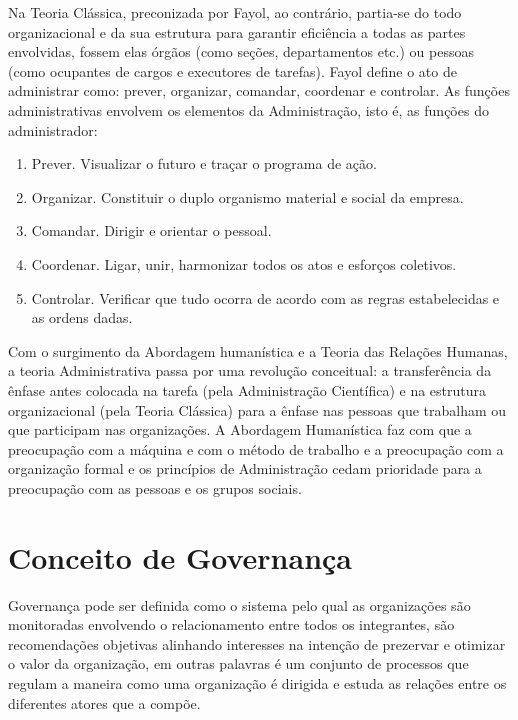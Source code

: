 Na Teoria Clássica, preconizada por Fayol, ao contrário, partia-se do todo 
organizacional e da sua estrutura para garantir eficiência a todas as partes 
envolvidas, fossem elas órgãos (como seções, departamentos etc.) ou pessoas 
(como ocupantes de cargos e executores de tarefas).
%
Fayol define o ato de administrar como: prever, organizar, comandar, coordenar 
e controlar. As funções administrativas envolvem os elementos da Administração, 
isto é, as funções do administrador:\cite{chiavenato2001teoria}

\begin{enumerate}

\item Prever. Visualizar o futuro e traçar o programa de ação.

\item Organizar. Constituir o duplo organismo material e social da empresa.

\item Comandar. Dirigir e orientar o pessoal.

\item Coordenar. Ligar, unir, harmonizar todos os atos e esforços coletivos.

\item Controlar. Verificar que tudo ocorra de acordo com as regras estabelecidas 
e as ordens dadas.

\end{enumerate}

Com o surgimento da Abordagem humanística e a Teoria das Relações Humanas,
a teoria Administrativa passa por uma revolução conceitual: a transferência da 
ênfase antes colocada na tarefa (pela Administração Científica) e na estrutura 
organizacional (pela Teoria Clássica) para a ênfase nas pessoas que trabalham 
ou que participam nas organizações. A Abordagem Humanística faz com que a
preocupação com a máquina e com o método de trabalho e a preocupação com a 
organização formal e os princípios de Administração cedam prioridade para a 
preocupação com as pessoas e os grupos sociais.


\section{Conceito de Governança}

Governança pode ser definida como o sistema pelo qual as organizações 
são monitoradas envolvendo o relacionamento entre todos os integrantes,
são recomendações objetivas alinhando interesses na intenção de prezervar e 
otimizar o valor da organização, em outras palavras é um conjunto de processos
que regulam a maneira como uma organização é dirigida e estuda as relações entre 
os diferentes atores que a compõe.\cite{molinarogestao}

